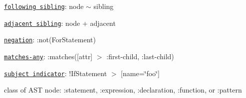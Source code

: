 \begin{DoxyItemize}
\item \href{http://dev.w3.org/csswg/selectors4/#general-sibling-combinators}{\tt following sibling}\+: {\ttfamily node $\sim$ sibling}
\item \href{http://dev.w3.org/csswg/selectors4/#adjacent-sibling-combinators}{\tt adjacent sibling}\+: {\ttfamily node + adjacent}
\item \href{http://dev.w3.org/csswg/selectors4/#negation-pseudo}{\tt negation}\+: {\ttfamily \+:not(\+For\+Statement)}
\item \href{http://dev.w3.org/csswg/selectors4/#matches}{\tt matches-\/any}\+: {\ttfamily \+:matches(\mbox{[}attr\mbox{]} $>$ \+:first-\/child, \+:last-\/child)}
\item \href{http://dev.w3.org/csswg/selectors4/#subject}{\tt subject indicator}\+: {\ttfamily !\+If\+Statement $>$ \mbox{[}name=\char`\"{}foo\char`\"{}\mbox{]}}
\item class of A\+ST node\+: {\ttfamily \+:statement}, {\ttfamily \+:expression}, {\ttfamily \+:declaration}, {\ttfamily \+:function}, or {\ttfamily \+:pattern}
\end{DoxyItemize}

\href{https://travis-ci.org/estools/esquery}{\tt } 